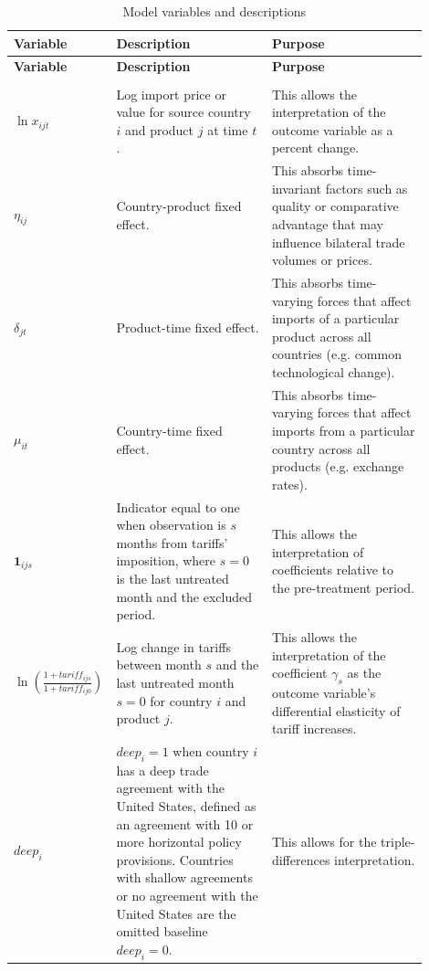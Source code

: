 \begingroup
\setlength{\LTleft}{0pt}
\setlength{\LTright}{0pt}
\begin{longtable}{p{0.14\linewidth} p{0.38\linewidth} p{0.38\linewidth}}
\caption{Model variables and descriptions}\label{tab:model_variables}\\
\hline\hline
\textbf{Variable} & \textbf{Description} & \textbf{Purpose}\\
\hline\hline
\endfirsthead
\hline\hline
\textbf{Variable} & \textbf{Description} & \textbf{Purpose}\\
\hline\hline
\endhead
\\[-1.5ex]
            
            $\ln x_{ijt}$ & Log import price or value for source country $i$ and product $j$ at time $t$. & This allows the interpretation of the outcome variable as a percent change. \\[1ex]
            
            $\eta_{ij}$ & Country-product fixed effect. & This absorbs time-invariant factors such as quality or comparative advantage that may influence bilateral trade volumes or prices. \\[1ex]

            $\delta_{jt}$ & Product-time fixed effect. & This absorbs time-varying forces that affect imports of a particular product across all countries (e.g. common technological change). \\[1ex]

            $\mu_{it}$ & Country-time fixed effect. & This absorbs time-varying forces that affect imports from a particular country across all products (e.g. exchange rates). \\[1ex]

            $\mathbf{1}_{ijs}$ & Indicator equal to one when observation is $s$ months from tariffs' imposition, where $s=0$ is the last untreated month and the excluded period. & This allows the interpretation of coefficients relative to the pre-treatment period. \\[1ex]

            $\ln \left( \frac{1 + tariff_{ijs}}{1 +  tariff_{ij0}} \right)$ & Log change in tariffs between month $s$ and the last untreated month $s=0$ for country $i$ and product $j$. & This allows the interpretation of the coefficient $\gamma_s$ as the outcome variable's differential elasticity of tariff increases. \\[1ex]

            $deep_i$ & $deep_i = 1$ when country $i$ has a deep trade agreement with the United States, defined as an agreement with 10 or more horizontal policy provisions. Countries with shallow agreements or no agreement with the United States are the omitted baseline $deep_i = 0$. & This allows for the triple-differences interpretation. \\[1ex] 
\hline
\end{longtable}
\endgroup

